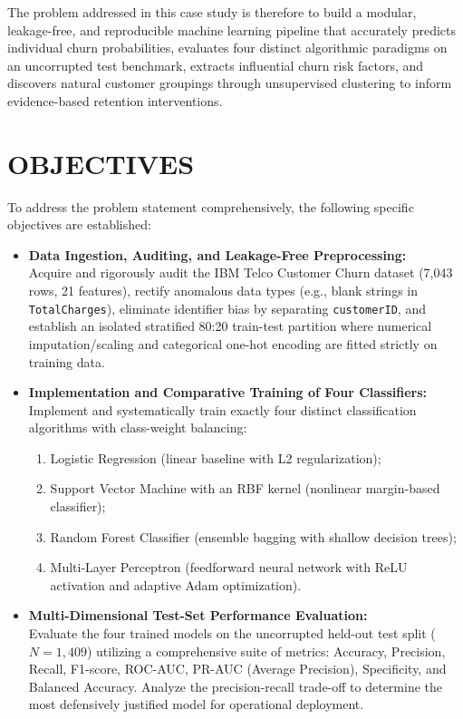 \documentclass[12pt,a4paper]{report}
\newcommand{\datasetTotalRows}{7,043}
\newcommand{\datasetTotalCols}{21}
\begin{document}
The problem addressed in this case study is therefore to build a modular, leakage-free, and reproducible machine learning pipeline that accurately predicts individual churn probabilities, evaluates four distinct algorithmic paradigms on an uncorrupted test benchmark, extracts influential churn risk factors, and discovers natural customer groupings through unsupervised clustering to inform evidence-based retention interventions.

\section{OBJECTIVES}
To address the problem statement comprehensively, the following specific objectives are established:

\begin{itemize}
    \item[\textbf{Objective 1:}] \textbf{Data Ingestion, Auditing, and Leakage-Free Preprocessing:}\\
    Acquire and rigorously audit the IBM Telco Customer Churn dataset (\datasetTotalRows{} rows, \datasetTotalCols{} features), rectify anomalous data types (e.g., blank strings in \texttt{TotalCharges}), eliminate identifier bias by separating \texttt{customerID}, and establish an isolated stratified 80:20 train-test partition where numerical imputation/scaling and categorical one-hot encoding are fitted strictly on training data.

    \item[\textbf{Objective 2:}] \textbf{Implementation and Comparative Training of Four Classifiers:}\\
    Implement and systematically train exactly four distinct classification algorithms with class-weight balancing:
    \begin{enumerate}
        \item Logistic Regression (linear baseline with L2 regularization);
        \item Support Vector Machine with an RBF kernel (nonlinear margin-based classifier);
        \item Random Forest Classifier (ensemble bagging with shallow decision trees);
        \item Multi-Layer Perceptron (feedforward neural network with ReLU activation and adaptive Adam optimization).
    \end{enumerate}

    \item[\textbf{Objective 3:}] \textbf{Multi-Dimensional Test-Set Performance Evaluation:}\\
    Evaluate the four trained models on the uncorrupted held-out test split ($N=1,409$) utilizing a comprehensive suite of metrics: Accuracy, Precision, Recall, F1-score, ROC-AUC, PR-AUC (Average Precision), Specificity, and Balanced Accuracy. Analyze the precision-recall trade-off to determine the most defensively justified model for operational deployment.


\end{itemize}
\end{document}
